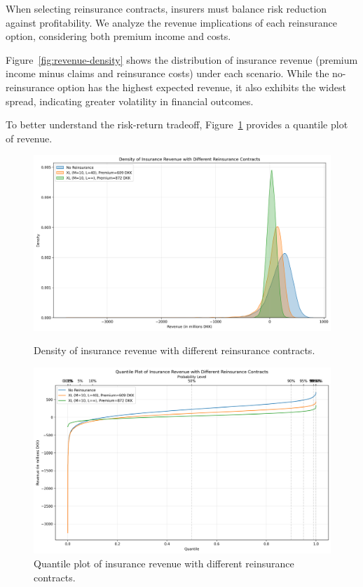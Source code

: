 \documentclass[8pt]{article}
\begin{document}
When selecting reinsurance contracts, insurers must balance risk reduction against profitability. We analyze the revenue implications of each reinsurance option, considering both premium income and costs.

Figure~\ref{fig:revenue-density} shows the distribution of insurance revenue (premium income minus claims and reinsurance costs) under each scenario. While the no-reinsurance option has the highest expected revenue, it also exhibits the widest spread, indicating greater volatility in financial outcomes.

To better understand the risk-return tradeoff, Figure~\ref{fig:revenue-quantile} provides a quantile plot of revenue.

\begin{figure}[h]
    \centering
    \begin{minipage}{0.48\textwidth}
        \centering
        \includegraphics[width=\linewidth]{Figures/reinsurance_revenue_density.png}
        \caption{Density of insurance revenue with different reinsurance contracts.}
        \label{fig:revenue-density}
    \end{minipage}
    \hfill
    \begin{minipage}{0.48\textwidth}
        \centering
        \includegraphics[width=\linewidth]{Figures/reinsurance_revenue_quantile.png}
        \caption{Quantile plot of insurance revenue with different reinsurance contracts.}
        \label{fig:revenue-quantile}
    \end{minipage}
\end{figure}
\end{document}
